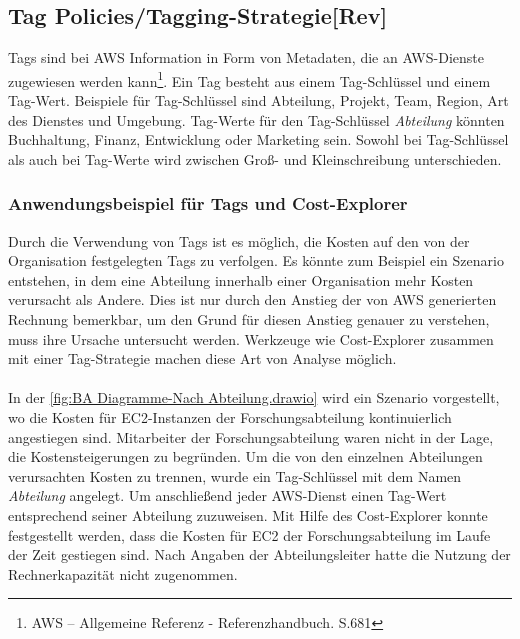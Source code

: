 \subsection*{Tag Policies/Tagging-Strategie[Rev]}
Tags sind bei AWS Information in Form von Metadaten, die an AWS-Dienste zugewiesen werden kann\footnote{AWS – Allgemeine Referenz - Referenzhandbuch. S.681\cite{AMZ29}}. Ein Tag besteht aus einem Tag-Schlüssel und einem Tag-Wert. Beispiele für Tag-Schlüssel sind Abteilung, Projekt, Team, Region, Art des Dienstes und Umgebung. Tag-Werte für den Tag-Schlüssel \textit{Abteilung} könnten Buchhaltung, Finanz, Entwicklung oder Marketing sein. Sowohl bei Tag-Schlüssel als auch bei Tag-Werte wird zwischen Groß- und Kleinschreibung unterschieden. 

\subsubsection*{Anwendungsbeispiel für Tags und Cost-Explorer}
Durch die Verwendung von Tags ist es möglich, die Kosten auf den von der Organisation festgelegten Tags zu verfolgen. Es könnte zum Beispiel ein Szenario entstehen, in dem eine Abteilung innerhalb einer Organisation mehr Kosten verursacht als Andere. Dies ist nur durch den Anstieg der von AWS generierten Rechnung bemerkbar, um den Grund für diesen Anstieg genauer zu verstehen, muss ihre Ursache untersucht werden. Werkzeuge wie Cost-Explorer zusammen mit einer Tag-Strategie machen diese Art von Analyse möglich.
\\\\
In der \autoref{fig:BA Diagramme-Nach Abteilung.drawio} wird ein Szenario vorgestellt, wo die Kosten für EC2-Instanzen der Forschungsabteilung kontinuierlich angestiegen sind. Mitarbeiter der Forschungsabteilung waren nicht in der Lage, die Kostensteigerungen zu begründen. 
Um die von den einzelnen Abteilungen verursachten Kosten zu trennen, wurde ein Tag-Schlüssel mit dem Namen \textit{Abteilung} angelegt. Um anschließend jeder AWS-Dienst einen Tag-Wert entsprechend seiner Abteilung zuzuweisen. Mit Hilfe des Cost-Explorer konnte festgestellt werden, dass die Kosten für EC2 der Forschungsabteilung im Laufe der Zeit gestiegen sind. Nach Angaben der Abteilungsleiter hatte die Nutzung der Rechnerkapazität nicht zugenommen.  
\newpage
